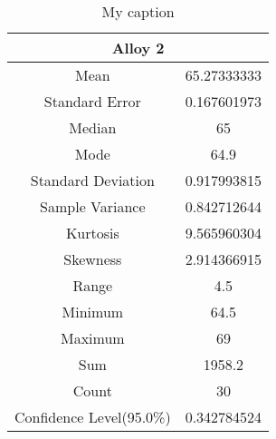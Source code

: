 \documentclass[letterpaper]{article}
\begin{document}
\begin{table}[H]
 \centering
 \begin{tabular}{|c|c|}
  \hline  \multicolumn{2}{|c|}{Alloy 2}  \\ \hline
  Mean                     & 65.27333333 \\ \hline
  Standard Error           & 0.167601973 \\ \hline
  Median                   & 65          \\ \hline
  Mode                     & 64.9        \\ \hline
  Standard Deviation       & 0.917993815 \\ \hline
  Sample Variance          & 0.842712644 \\ \hline
  Kurtosis                 & 9.565960304 \\ \hline
  Skewness                 & 2.914366915 \\ \hline
  Range                    & 4.5         \\ \hline
  Minimum                  & 64.5        \\ \hline
  Maximum                  & 69          \\ \hline
  Sum                      & 1958.2      \\ \hline
  Count                    & 30          \\ \hline
  Confidence Level(95.0\%) & 0.342784524 \\ \hline
 \end{tabular}
 \caption{My caption}
 \label{3a2}
\end{table}
\end{document}
